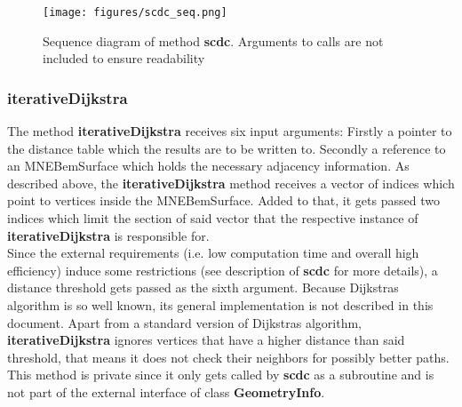 \clearpage

\begin{figure}[h]
	\begin{center}
		\texttt{[image: figures/scdc\_seq.png]}
		\caption{Sequence diagram of method \textbf{scdc}. Arguments to calls are not included to ensure readability}
	\end{center}
\end{figure}

\subsubsection{iterativeDijkstra}
The method \textbf{iterativeDijkstra} receives six input arguments: Firstly a pointer to the distance table which the results are to be written to. Secondly a reference to an MNEBemSurface which holds the necessary adjacency information. As described above, the \textbf{iterativeDijkstra} method receives a vector of indices which point to vertices inside the MNEBemSurface. Added to that, it gets passed two indices which limit the section of said vector that the respective instance of \textbf{iterativeDijkstra} is responsible for.\\
Since the external requirements (i.e. low computation time and overall high efficiency) induce some restrictions (see description of \textbf{scdc} for more details), a distance threshold gets passed as the sixth argument. Because Dijkstras algorithm is so well known, its general implementation is not described in this document. Apart from a standard version of Dijkstras algorithm, \textbf{iterativeDijkstra} ignores vertices that have a higher distance than said threshold, that means it does not check their neighbors for possibly better paths.\\
This method is private since it only gets called by \textbf{scdc} as a subroutine and is not part of the external interface of class \textbf{GeometryInfo}.

